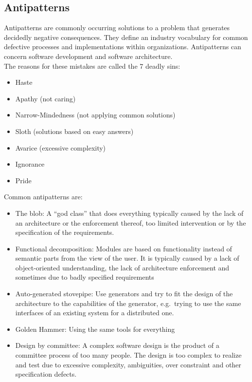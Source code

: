 \subsection{Antipatterns}
Antipatterns are commonly occurring solutions to a problem that generates decidedly negative consequences.
They define an industry vocabulary for common defective processes and implementations within organizations.
Antipatterns can concern software development and software architecture.\\
The reasons for these mistakes are called the 7 deadly sins:
\begin{itemize}
  \item Haste
  \item Apathy (not caring)
  \item Narrow-Mindedness (not applying common solutions)
  \item Sloth (solutions based on easy answers)
  \item Avarice (excessive complexity)
  \item Ignorance
  \item Pride
\end{itemize}

Common antipatterns are:
\begin{itemize}
  \item The blob: A ``god class'' that does everything typically caused by the lack of an architecture or the enforcement thereof, too limited intervention or by the specification of the requirements. 
  \item Functional decomposition: Modules are based on functionality instead of semantic parts from the view of the user. It is typically caused by a lack of object-oriented understanding, the lack of architecture enforcement and sometimes due to badly specified requirements
  \item Auto-generated stovepipe: Use generators and try to fit the design of the architecture to the capabilities of the generator, e.g.\ trying to use the same interfaces of an existing system for a distributed one.
  \item Golden Hammer: Using the same tools for everything
  \item Design by committee: A complex software design is the product of a committee process of too many people. The design is too complex to realize and test due to excessive complexity, ambiguities, over constraint and other specification defects.
\end{itemize}

